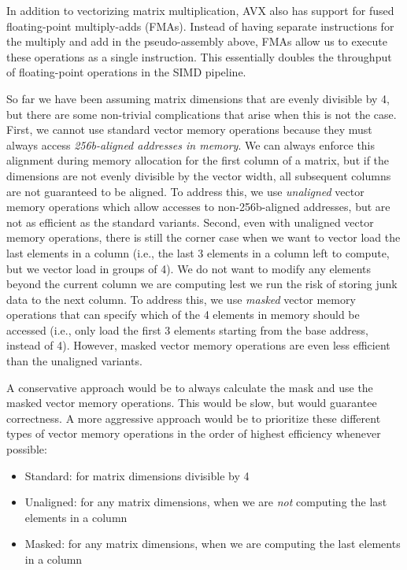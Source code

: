 In addition to vectorizing matrix multiplication, AVX also has support
for fused floating-point multiply-adds (FMAs). Instead of having separate
instructions for the multiply and add in the pseudo-assembly above, FMAs
allow us to execute these operations as a single instruction. This
essentially doubles the throughput of floating-point operations in the
SIMD pipeline.
\smallskip

So far we have been assuming matrix dimensions that are evenly divisible
by 4, but there are some non-trivial complications that arise when this
is not the case. First, we cannot use standard vector memory operations
because they must always access \emph{256b-aligned addresses in
  memory}. We can always enforce this alignment during memory allocation
for the first column of a matrix, but if the dimensions are not evenly
divisible by the vector width, all subsequent columns are not guaranteed
to be aligned. To address this, we use \emph{unaligned} vector
memory operations which allow accesses to non-256b-aligned addresses, but are
not as efficient as the standard variants. Second, even with unaligned
vector memory operations, there is still the corner case when we want to
vector load the last elements in a column (i.e., the last 3 elements in a
column left to compute, but we vector load in groups of 4). We do not
want to modify any elements beyond the current column we are computing
lest we run the risk of storing junk data to the next column. To address
this, we use \emph{masked} vector memory operations that can specify which of
the 4 elements in memory should be accessed (i.e., only load the first 3
elements starting from the base address, instead of 4). However, masked
vector memory operations are even less efficient than the unaligned
variants.
\smallskip

A conservative approach would be to always calculate the mask and use the
masked vector memory operations. This would be slow, but would guarantee
correctness. A more aggressive approach would be to prioritize these
different types of vector memory operations in the order of highest efficiency
whenever possible:
\smallskip

\begin{itemize}
  \item Standard: for matrix dimensions divisible by 4
  \item Unaligned: for any matrix dimensions, when we are \emph{not}
    computing the last elements in a column
  \item Masked: for any matrix dimensions, when we are computing the last
    elements in a column
\end{itemize}
\medskip

